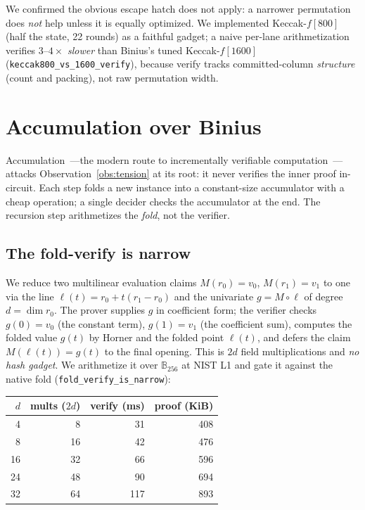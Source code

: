 \documentclass[11pt]{article}
\newcommand{\bt}{\mathbb{B}}
\newcommand{\field}[1]{\bt_{#1}}
\begin{document}
We confirmed the obvious escape hatch does not apply: a narrower permutation
does \emph{not} help unless it is equally optimized. We implemented Keccak-$f[800]$
(half the state, 22 rounds) as a faithful gadget; a naive per-lane arithmetization
verifies $3$--$4\times$ \emph{slower} than Binius's tuned Keccak-$f[1600]$
(\texttt{keccak800\_vs\_1600\_verify}), because verify tracks committed-column
\emph{structure} (count and packing), not raw permutation width.

\section{Accumulation over Binius}\label{sec:accum}

Accumulation~\cite{nova,protostar,pcdaccum}---the modern route to incrementally
verifiable computation~\cite{ivc}---attacks Observation~\ref{obs:tension} at its
root: it never verifies the inner proof in-circuit. Each step folds a new
instance into a constant-size accumulator with a cheap operation; a single
decider checks the accumulator at the end. The recursion step arithmetizes the
\emph{fold}, not the verifier.

\subsection{The fold-verify is narrow}

We reduce two multilinear evaluation claims $M(r_0)=v_0$, $M(r_1)=v_1$ to one via
the line $\ell(t)=r_0+t(r_1-r_0)$ and the univariate $g=M\circ\ell$ of degree
$d=\dim r_0$. The prover supplies $g$ in coefficient form; the verifier checks
$g(0)=v_0$ (the constant term), $g(1)=v_1$ (the coefficient sum), computes the
folded value $g(t)$ by Horner and the folded point $\ell(t)$, and defers the claim
$M(\ell(t))=g(t)$ to the final opening. This is $2d$ field multiplications and
\emph{no hash gadget}. We arithmetize it over $\field{256}$ at NIST L1 and gate
it against the native fold (\texttt{fold\_verify\_is\_narrow}):

\begin{center}
\begin{tabular}{rrrr}
\toprule
$d$ & mults ($2d$) & verify (ms) & proof (KiB)\\
\midrule
4  & 8  & 31  & 408\\
8  & 16 & 42  & 476\\
16 & 32 & 66  & 596\\
24 & 48 & 90  & 694\\
32 & 64 & 117 & 893\\
\bottomrule
\end{tabular}
\end{center}
\end{document}
